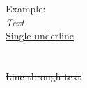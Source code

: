 \documentclass[12pt]{article}
\begin{document}
Example:\\
 \emph{Text}\\
 \uline{Single underline}\\
 \\
 \\
 \sout{Line through text}\\
 
\end{document}
